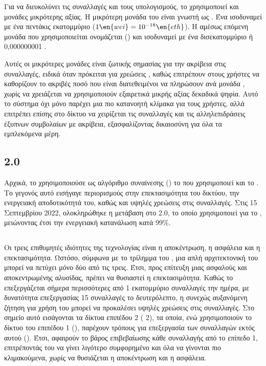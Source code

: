 Για να διευκολύνει τις συναλλαγές και τους υπολογισμούς, το  χρησιμοποιεί και μονάδες μικρότερης αξίας. Η μικρότερη μονάδα του  είναι γνωστή ως . Ένα  ισοδυναμεί με ένα πεντάκις εκατομμύριο  ($1 \en{wei} = 10^{-18} \en{eth}$). H αμέσως επόμενη μονάδα που χρησιμοποιείται ονομάζεται  () και ισοδυναμεί με ένα δισεκατομμύριο  ή 0,000000001 .

Αυτές οι μικρότερες μονάδες  είναι ζωτικής σημασίας για την ακρίβεια στις συναλλαγές, ειδικά όταν πρόκειται για χρεώσεις , καθώς επιτρέπουν στους χρήστες να καθορίζουν το ακριβές ποσό που είναι διατεθειμένοι να πληρώσουν ανά μονάδα , χωρίς να χρειάζεται να χρησιμοποιούν εξαιρετικά μικρής αξίας δεκαδικά ψηφία. Αυτό το σύστημα όχι μόνο παρέχει μια πιο κατανοητή κλίμακα για τους χρήστες, αλλά επιτρέπει επίσης στο δίκτυο  να χειρίζεται τις συναλλαγές και τις αλληλεπιδράσεις έξυπνων συμβολαίων με ακρίβεια, εξασφαλίζοντας δικαιοσύνη για όλα τα εμπλεκόμενα μέρη.

\subsection{ 2.0}
Αρχικά, το  χρησιμοποιούσε ως αλγόριθμο συναίνεσης () το  που χρησιμοποιεί και το . Το γεγονός αυτό εισήγαγε περιορισμούς στην επεκτασιμότητα του δικτύου, την ενεργειακή αποδοτικότητά του, καθώς και υψηλές χρεώσεις στις συναλλαγές. Στις 15 Σεπτεμβρίου 2022, ολοκληρώθηκε η μετάβαση στο  2.0, το οποίο χρησιμοποιεί για  το , μειώνοντας έτσι την ενεργειακή κατανάλωση κατά 99\%. 

\subsection{}
Οι τρεις επιθυμητές ιδιότητες της τεχνολογίας  είναι η αποκέντρωση, η ασφάλεια και η επεκτασιμότητα. Ωστόσο, σύμφωνα με το τρίλημμα του , μια απλή αρχιτεκτονική του μπορεί να πετύχει μόνο δύο από τις τρεις. Έτσι, προς επίτευξη μιας ασφαλούς και αποκεντρωμένης αλυσίδας, πρέπει να θυσιαστεί η επεκτασιμότητα. 
Καθώς το  επεξεργάζεται σήμερα περισσότερες από 1 εκατομμύριο συναλλαγές την ημέρα, με δυνατότητα επεξεργασίας 15 συναλλαγές το δευτερόλεπτο, η συνεχώς αυξανόμενη ζήτηση για χρήση του μπορεί να προκαλέσει υψηλές χρεώσεις στις συναλλαγές.
Στο σημείο αυτό εισάγονται τα δίκτυα επιπέδου 2 ( 2), τα οποία, ενώ χρησιμοποιούν το δίκτυο του επιπέδου 1 (), παρέχουν τρόπους για επεξεργασία των συναλλαγών εκτός αυτού (). Έτσι, αφαιρούν το βάρος επιβεβαίωσης κάθε συναλλαγής από το επίπεδο 1, επιτρέποντάς του να γίνει λιγότερο συμφορημένο και όλα να γίνονται πιο κλιμακούμενα, χωρίς να θυσιάζεται η αποκέντρωση και η ασφάλεια. 



